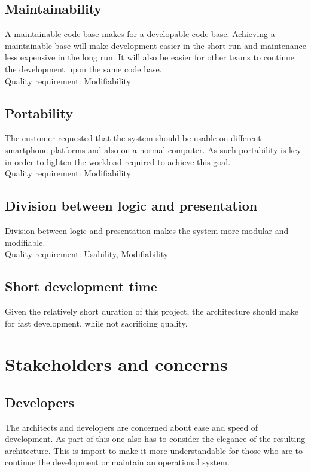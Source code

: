 \documentclass[11pt]{book}
\begin{document}
\subsection{Maintainability} 
A maintainable code base makes for a developable code base. Achieving a maintainable base will make development easier in the short run and maintenance less expensive in the long run. It will also be easier for other teams to continue the development upon the same code base.\\
Quality requirement: Modifiability

\subsection{Portability}
The customer requested that the system should be usable on different smartphone platforms and also on a normal computer. As such portability is key in order to lighten the workload required to achieve this goal.\\
Quality requirement: Modifiability

\subsection{Division between logic and presentation}
Division between logic and presentation makes the system more modular and modifiable.\\
Quality requirement: Usability, Modifiability

\subsection{Short development time}
Given the relatively short duration of this project, the architecture should make for fast development, while not sacrificing quality.

\section{Stakeholders and concerns}

\subsection{Developers}
The architects and developers are concerned about ease and speed of development. As part of this one also has to consider the elegance of the resulting architecture. This is import to make it more understandable for those who are to continue the development or maintain an operational system.
\end{document}
